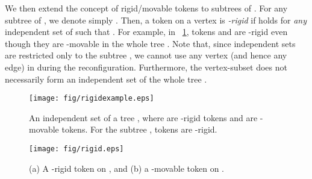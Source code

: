 \documentclass{llncs}
\begin{document}
	We then extend the concept of rigid/movable tokens to subtrees of . 
	For any subtree  of , we denote simply .
	Then, a token on a vertex  is \emph{-rigid} if  holds for \emph{any} independent set  of  such that .
	For example, in \figurename~\ref{fig:rigidexample}, tokens  and  are -rigid even though they are -movable in the whole tree . 
	Note that, since independent sets are restricted only to the subtree , we cannot use any vertex (and hence any edge) in  during the reconfiguration. 
	Furthermore, the vertex-subset  does not necessarily form an independent set of the whole tree . 
\medskip

\begin{figure}[t]
\begin{center}
	\texttt{[image: fig/rigidexample.eps]}
	\end{center}
	\vspace{-1em}
	\caption{An independent set  of a tree , where  are -rigid tokens and  are -movable tokens. For the subtree , tokens  are -rigid.}
	\label{fig:rigidexample}
\end{figure}


 \begin{figure}[b]
\begin{center}
	\texttt{[image: fig/rigid.eps]}
	\end{center}
	\vspace{-1em}
	\caption{(a) A -rigid token on , and (b) a -movable token on .}
	\label{fig:rigidmovable}
\end{figure}
\end{document}
